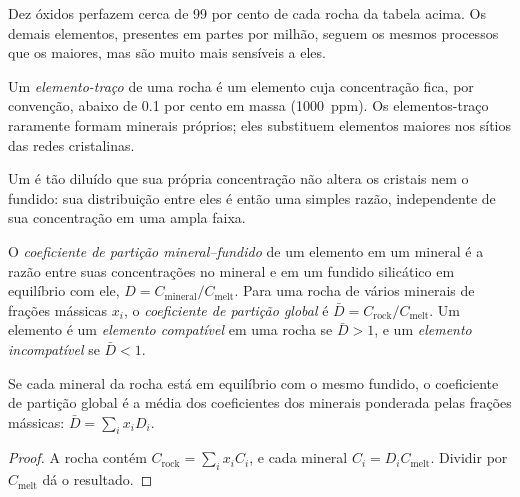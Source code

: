 Dez óxidos perfazem cerca de 99 por cento de cada rocha da tabela acima. Os demais elementos,
presentes em partes por milhão, seguem os mesmos processos que os maiores, mas
são muito mais sensíveis a eles.

\begin{definition}\label{def:b2:elements-in-the-earth:trace}
Um \emph{elemento-traço} de uma rocha é um elemento cuja
concentração fica, por convenção, abaixo de 0.1 por cento em massa (\qty{1000}{ppm}).
Os elementos-traço raramente formam minerais próprios; eles substituem elementos
maiores nos sítios das redes cristalinas.
\end{definition}

Um  é tão diluído que sua própria concentração não altera os
cristais nem o fundido: sua distribuição entre eles é então uma simples razão,
independente de sua concentração em uma ampla faixa.

\begin{definition}\label{def:b2:elements-in-the-earth:partition}
O \emph{coeficiente de partição mineral--fundido}
de um elemento em um mineral é a razão entre suas concentrações no
mineral e em um fundido silicático em equilíbrio com ele,
$D = C_{\mathrm{mineral}}/C_{\mathrm{melt}}$. Para uma rocha de vários minerais de
frações mássicas $x_i$, o \emph{coeficiente de partição global} é
$\bar D = C_{\mathrm{rock}}/C_{\mathrm{melt}}$. Um elemento é um
\emph{elemento compatível} em uma rocha se $\bar D > 1$,
e um \emph{elemento incompatível} se $\bar D < 1$.
\end{definition}

\begin{proposition}
\label{prop:b2:elements-in-the-earth:bulk-d}
Se cada mineral da rocha está em equilíbrio com o mesmo fundido, o coeficiente
de partição global é a média dos coeficientes dos minerais ponderada pelas
frações mássicas: $\bar D = \sum_i x_i D_i$.
\end{proposition}

\begin{proof}
A rocha contém $C_{\mathrm{rock}} = \sum_i x_i C_i$, e cada mineral
$C_i = D_i C_{\mathrm{melt}}$. Dividir por $C_{\mathrm{melt}}$ dá o resultado.
\end{proof}

